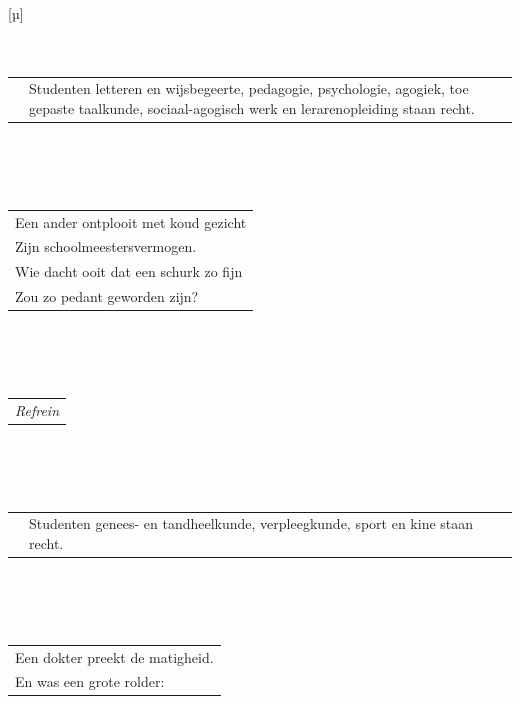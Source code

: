 \documentclass{article}
\begin{document}
\\\\\\
[µ]
\\\\\\
\begin{tabularx}{\textwidth} {
   c >{\raggedright\arraybackslash}X}
    \hspace{5mm} & {\small Studenten letteren en wijsbegeerte, pedagogie, psychologie, agogiek, toe
gepaste taalkunde, sociaal-agogisch werk en lerarenopleiding staan recht.}\\
\end{tabularx}
\\\\\\
\begin{tabularx}{0.7\textwidth} {
   >{\raggedright\arraybackslash}X }
Een ander ontplooit met koud gezicht\\
Zijn schoolmeestersvermogen.\\
Wie dacht ooit dat een schurk zo fijn\\
Zou zo pedant geworden zijn?\\
\end{tabularx}
\\\\\\
\begin{tabularx}{0.7\textwidth} {
   >{\raggedright\arraybackslash}X }
   \textit{Refrein}\\
\end{tabularx}
\\\\\\
\begin{tabularx}{\textwidth} {
   c >{\raggedright\arraybackslash}X}
    \hspace{5mm} & {\small Studenten genees- en tandheelkunde, verpleegkunde, sport en kine staan
recht.}\\
\end{tabularx}
\\\\\\
\begin{tabularx}{0.7\textwidth} {
   >{\raggedright\arraybackslash}X }
   Een dokter preekt de matigheid.\\
En was een grote rolder:\\
\end{tabularx}
\end{document}
